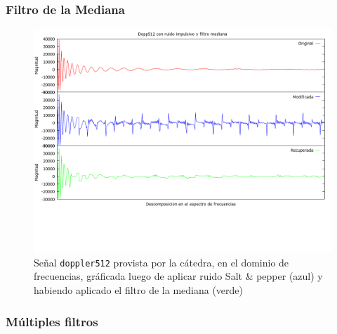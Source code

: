 \subsubsection{Filtro de la Mediana}

\begin{figure}[H]
\begin {center}
\includegraphics[width=500pt]{imagenes/dopp512-imp-median.png}
\end {center}
\caption{Se\~nal \texttt{doppler512} provista por la c\'atedra, en el dominio de frecuencias, gr\'aficada
luego de aplicar ruido Salt & pepper (azul) y habiendo aplicado el filtro de la mediana (verde)}
\label{fig:SinProm}
\end{figure}


\subsubsection{M\'ultiples filtros}

